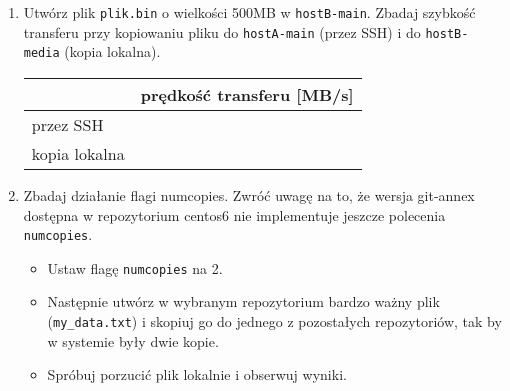 \documentclass[polish]{article}
\newif\ifteacher
\begin{document}
\begin{enumerate}
    \item
    Utwórz plik \texttt{plik.bin} o wielkości 500MB w \texttt{hostB-main}.
    Zbadaj szybkość
    transferu przy kopiowaniu pliku do \texttt{hostA-main} (przez SSH) i do
    \texttt{hostB-media} (kopia lokalna).

    \begin{tabular}{|l|p{}|}
    \hline
    & prędkość transferu [MB/s] \\
    \hline
    przez SSH & \\
    \hline
    kopia lokalna & \\
    \hline
    \end{tabular}

\ifteacher
    \begin{lstlisting}
hostB:hostB-main.git$ dd if=/dev/zero of=large.bin bs=1024 count=500000
hostB:hostB-main.git$ git annex add large.bin
hostB:hostB-main.git$ git commit -m "Added large.bin"
    \end{lstlisting}

    Przykładowe wyniki:

    \begin{lstlisting}
[root@lab429-08 hostB-main.git]# git annex copy --to hostA-main plik.bin
copy plik.bin (checking hostA-main...) (to hostA-main...) SHA256-s512000000--4c98cf638799a07eb85872e7f5f5d8d661c09e6e15af02f3655ed9250cae13b0
512000000 100\% 45.98MB/s 0:00:10 (xfer#1, to-check=0/1)

sent 512062644 bytes received 31 bytes 48767873.81 bytes/sec
total size is 512000000 speedup is 1.00
ok
(Recording state in git...)


[root@lab429-08 hostB-main.git]# git annex copy --to hostB-backup plik.bin
copy plik.bin (to hostB-backup...) SHA256-s512000000--4c98cf638799a07eb85872e7f5f5d8d661c09e6e15af02f3655ed9250cae13b0
512000000 100\% 115.10MB/s 0:00:04 (xfer#1, to-check=0/1)

sent 512062644 bytes received 31 bytes 113791705.56 bytes/sec
total size is 512000000 speedup is 1.00
ok
(Recording state in git...)
    \end{lstlisting}
\fi

    \item
    Zbadaj działanie flagi numcopies. Zwróć uwagę na to, że wersja git-annex
    dostępna w repozytorium centos6 nie implementuje jeszcze polecenia
    \texttt{numcopies}.

    \begin{itemize}
        \item Ustaw flagę \texttt{numcopies} na 2.
        \item Następnie utwórz w wybranym repozytorium bardzo ważny plik
              (\texttt{my\_data.txt}) i skopiuj go do jednego z pozostałych
              repozytoriów, tak by w systemie były dwie kopie.
        \item Spróbuj porzucić plik lokalnie i obserwuj wyniki.
    \end{itemize}


\end{enumerate}
\end{document}
